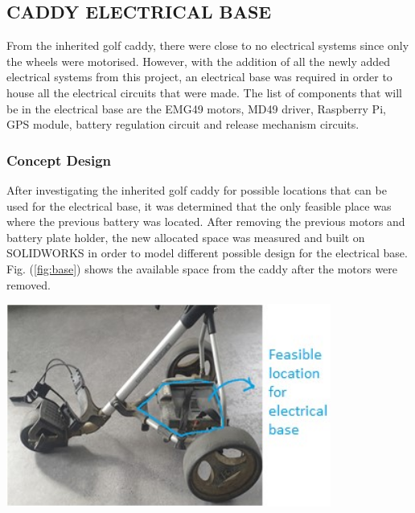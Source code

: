 \documentclass[11pt,landscape]{article}
\newenvironment{Figure}
  {\par\medskip\noindent\minipage{\linewidth}}
  {\endminipage\par\medskip}
\begin{document}
\newpage
\begin{multicols}{2}
    \subsection{CADDY ELECTRICAL BASE}
    From the inherited golf caddy, there were close to no electrical systems
    since only the wheels were motorised. However, with the addition of all the
    newly added electrical systems from this project, an electrical base was
    required in order to house all the electrical circuits that were made. The
    list of components that will be in the electrical base are the EMG49 motors,
    MD49 driver, Raspberry Pi, GPS module, battery regulation circuit and
    release mechanism circuits.
    
    \subsubsection{Concept Design}
    After investigating the inherited golf caddy for possible locations that can
    be used for the electrical base, it was determined that the only
    feasible place was where the previous battery was located. After removing the
    previous motors and battery plate holder, the new allocated space was
    measured and built on SOLIDWORKS in order to model different possible design
    for the electrical base. Fig. (\ref{fig:base}) shows the available space
    from the caddy after the motors were removed.
    
    \begin{Figure}
        \begin{center}
            \includegraphics[width=0.8\textwidth]{Figure22.jpg}
            \label{fig:base}
        \end{center}
    \end{Figure}
    

\end{multicols}
\end{document}
